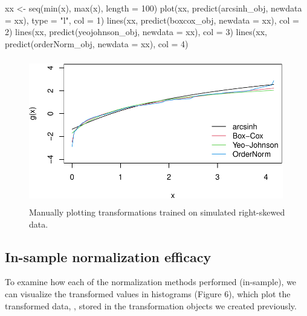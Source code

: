 \begin{Schunk}
\begin{Sinput}
xx <- seq(min(x), max(x), length = 100)
plot(xx, predict(arcsinh_obj, newdata = xx), type = "l", col = 1)
lines(xx, predict(boxcox_obj, newdata = xx), col = 2)
lines(xx, predict(yeojohnson_obj, newdata = xx), col = 3)
lines(xx, predict(orderNorm_obj, newdata = xx), col = 4)
\end{Sinput}
\end{Schunk}

\begin{Schunk}
\begin{figure}

{\centering \includegraphics[width=4.375in,height=2.5in]{figs/visdata2-1} 

}

\caption[Manually plotting transformations trained on simulated right-skewed data]{Manually plotting transformations trained on simulated right-skewed data.}\label{fig:visdata2}
\end{figure}
\end{Schunk}

\hypertarget{in-sample-normalization-efficacy}{%
\subsection{In-sample normalization
efficacy}\label{in-sample-normalization-efficacy}}

To examine how each of the normalization methods performed (in-sample),
we can visualize the transformed values in histograms (Figure 6), which
plot the transformed data, , stored in the transformation
objects we created previously.

